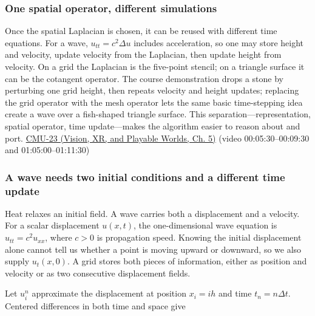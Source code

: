 \subsubsection{One spatial operator, different simulations}\label{04-visual-computing-ii-ch030-one-spatial-operator-different-simulations}

\hypertarget{04-visual-computing-ii-ch030-one-spatial-operator-different-simulations}{}

Once the spatial Laplacian is chosen, it can be reused with different time equations. For a wave, \(u_{tt}=c^2\Delta u\) includes acceleration, so one may store height and velocity, update velocity from the Laplacian, then update height from velocity. On a grid the Laplacian is the five-point stencil; on a triangle surface it can be the cotangent operator. The course demonstration drops a stone by perturbing one grid height, then repeats velocity and height updates; replacing the grid operator with the mesh operator lets the same basic time-stepping idea create a wave over a fish-shaped triangle surface. This separation---representation, spatial operator, time update---makes the algorithm easier to reason about and port. \href{../07-Vision-XR-and-Playable-Worlds/main.pdf\#nameddest=04-visual-computing-ii-ch036-cmu-23---physically-based-animation-and-pdes}{CMU-23 (Vision, XR, and Playable Worlds, Ch. 5)} (video 00:05:30--00:09:30 and 01:05:00--01:11:30)

\subsubsection{A wave needs two initial conditions and a different time update}\label{04-visual-computing-ii-ch030-a-wave-needs-two-initial-conditions-and-a-different-time-update}

\hypertarget{04-visual-computing-ii-ch030-a-wave-needs-two-initial-conditions-and-a-different-time-update}{}

Heat relaxes an initial field. A wave carries both a displacement and a velocity. For a scalar displacement \(u(x,t)\), the one-dimensional wave equation is \(u_{tt}=c^2u_{xx}\), where \(c>0\) is propagation speed. Knowing the initial displacement alone cannot tell us whether a point is moving upward or downward, so we also supply \(u_t(x,0)\). A grid stores both pieces of information, either as position and velocity or as two consecutive displacement fields.

Let \(u_i^n\) approximate the displacement at position \(x_i=i h\) and time \(t_n=n\Delta t\). Centered differences in both time and space give

